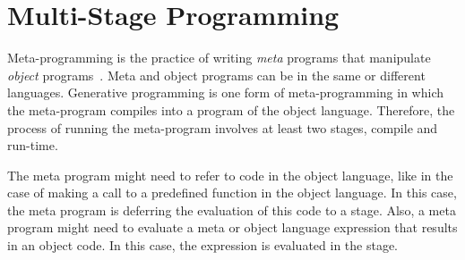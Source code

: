 \section{Multi-Stage Programming}
\label{sec:background:msp}
Meta-programming is the practice of writing \emph{meta} programs that manipulate \emph{object} programs~\cite{sheard2001Challenges, sheard2002TH,metaProg2019Survey}. Meta and object programs can be in the same or different languages. Generative programming is one form of meta-programming in which the meta-program compiles into a program of the object language. Therefore, the process of running the meta-program involves at least two stages, compile and run-time. 

The meta program might need to refer to code in the object language, like in the case of making a call to a predefined function in the object language. In this case, the meta program is deferring the evaluation of this code to a  stage. 
Also, a meta program might need to evaluate a meta or object language expression that results in an object code. In this case, the expression is evaluated in the  stage. 

